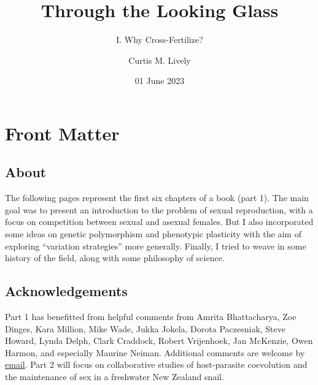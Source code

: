 \documentclass[
  11pt,
  letterpaper,
]{scrbook}
\title{Through the Looking Glass}
\subtitle{I. Why Cross-Fertilize?}
\author{Curtis M. Lively}
\date{01 June 2023}
\renewcommand*\contentsname{Table of contents}
\newcommand\contentsname{Table of contents}
\begin{document}
\frontmatter
\maketitle
\ifdefined\Shaded\renewenvironment{Shaded}{\begin{tcolorbox}[sharp corners, boxrule=0pt, borderline west={3pt}{0pt}{shadecolor}, interior hidden, breakable, frame hidden, enhanced]}{\end{tcolorbox}}\fi

\renewcommand*\contentsname{Contents}
{
\hypersetup{linkcolor=}
\setcounter{tocdepth}{2}
\tableofcontents
}
\listoffigures
\listoftables
\mainmatter
{}

\hypertarget{front-matter}{%
\chapter*{Front Matter}\label{front-matter}}


\hypertarget{about}{%
\section*{About}\label{about}}


The following pages represent the first six chapters of a book (part 1).
The main goal was to present an introduction to the problem of sexual
reproduction, with a focus on competition between sexual and asexual
females. But I also incorporated some ideas on genetic polymorphism and
phenotypic plasticity with the aim of exploring ``variation strategies''
more generally. Finally, I tried to weave in some history of the field,
along with some philosophy of science.

\hypertarget{acknowledgements}{%
\section*{Acknowledgements}\label{acknowledgements}}


Part 1 has benefitted from helpful comments from Amrita Bhattacharya,
Zoe Dinges, Kara Million, Mike Wade, Jukka Jokela, Dorota Paczesniak,
Steve Howard, Lynda Delph, Clark Craddock, Robert Vrijenhoek, Jan
McKenzie, Owen Harmon, and especially Maurine Neiman. Additional
comments are welcome by \href{mailto:clively@indiana.edu}{email}. Part 2
will focus on collaborative studies of host-parasite coevolution and the
maintenance of sex in a freshwater New Zealand snail.
\end{document}
